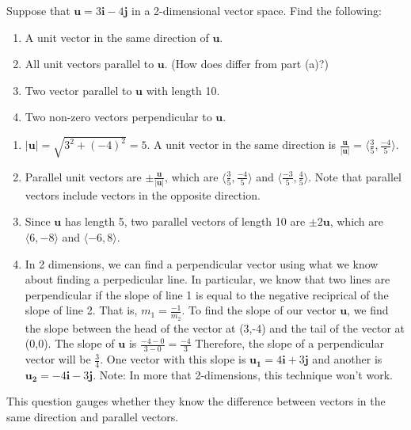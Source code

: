 \documentclass[handout]{ximera}
\begin{document}
\begin{problem}
Suppose that $\mathbf{u}=3 \mathbf{i} - 4 \mathbf{j}$ in a 2-dimensional vector space. Find the following:
\begin{enumerate}
\item A unit vector in the same direction of $\mathbf{u}$. 
\item All unit vectors parallel to $\mathbf{u}$. (How does differ from part (a)?)
\item Two vector parallel to $\mathbf{u}$ with length 10.
\item Two non-zero vectors perpendicular to $\mathbf{u}$.
\end{enumerate}
	\begin{freeResponse}
	\begin{enumerate}
	\item $|\mathbf{u}|= \sqrt{3^2+(-4)^2} = 5$. A unit vector in the same direction is $\frac{\mathbf{u}}{|\mathbf{u}|}= \langle \frac{3}{5}, \frac{-4}{5} \rangle.$
	\item Parallel unit vectors are $\pm \frac{\mathbf{u}}{|\mathbf{u}|}$, which are $\langle \frac{3}{5}, \frac{-4}{5} \rangle$ and $\langle \frac{-3}{5}, \frac{4}{5} \rangle$. Note that parallel vectors include vectors in the opposite direction. 
	\item Since $\mathbf{u}$ has length 5, two parallel vectors of length 10 are $\pm 2\mathbf{u}$, which are $\langle 6, -8 \rangle$ and $\langle -6, 8 \rangle$. 
	\item In 2 dimensions, we can find a perpendicular vector using what we know about finding a perpedicular line.  In particular, we know that two lines are perpendicular if the slope of line 1 is equal to the negative reciprical of the slope of line 2.  That is, $m_1 = \frac{-1}{m_2}.$  To find the slope of our vector $\mathbf{u}$, we find the slope between the head of the vector at (3,-4) and the tail of the vector at (0,0).  The slope of $\mathbf{u}$ is $\frac{-4-0}{3-0} = \frac{-4}{3}$  Therefore, the slope of a perpendicular vector will be $\frac{3}{4}$.  One vector with this slope is $\boxed{\mathbf{u_1}=4 \mathbf{i} +3 \mathbf{j}}$ and another is $\boxed{\mathbf{u_2}=- 4 \mathbf{i} - 3 \mathbf{j}}$.  Note: In more that 2-dimensions, this technique won't work.
	\end{enumerate}
	\end{freeResponse}

\end{problem}

\begin{instructorNotes}
This question gauges whether they know the difference between vectors in the same direction and parallel vectors.
\end{instructorNotes}
\end{document}
